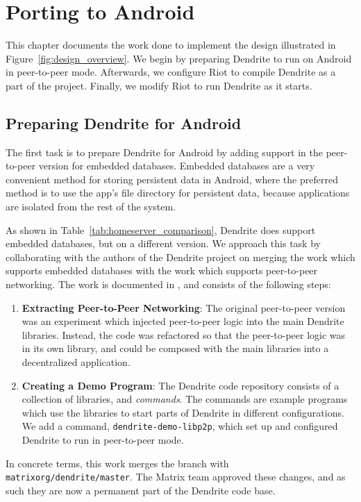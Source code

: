 \chapter{Porting to Android}\label{chp:implementation}
This chapter documents the work done to implement the design illustrated in Figure~\ref{fig:design_overview}.
We begin by preparing Dendrite to run on Android in peer-to-peer mode.
Afterwards, we configure Riot to compile Dendrite as a part of the project.
Finally, we modify Riot to run Dendrite as it starts.

\section{Preparing Dendrite for Android}\label{sec:preparing_dendrite}
The first task is to prepare Dendrite for Android by adding support in the peer-to-peer version for embedded databases.
Embedded databases are a very convenient method for storing persistent data in Android, where the preferred method is to use the app's file directory for persistent data\cite{android_devdocs_data_storage, android_devdocs_internal_storage}, because applications are isolated from the rest of the system.

As shown in Table~\ref{tab:homeserver_comparison}, Dendrite does support embedded databases, but on a different version.
We approach this task by collaborating with the authors of the Dendrite project on merging the work which supports embedded databases with the work which supports peer-to-peer networking.
The work is documented in , and consists of the following steps:
\begin{enumerate}
	\item{
	      \textbf{Extracting Peer-to-Peer Networking}:
	      The original peer-to-peer version was an experiment which injected peer-to-peer logic into the main Dendrite libraries.
	      Instead, the code was refactored so that the peer-to-peer logic was in its own library, and could be composed with the main libraries into a decentralized application.
	      }
	\item{
	      \textbf{Creating a Demo Program}:
	      The Dendrite code repository consists of a collection of libraries, and \textit{commands}.
	      The commands are example programs which use the libraries to start parts of Dendrite in different configurations.
	      We add a command, \texttt{dendrite-demo-libp2p}, which set up and configured Dendrite to run in peer-to-peer mode.
	      }
\end{enumerate}
In concrete terms, this work merges the  branch with \texttt{matrix\-org/dendrite/master}.
The Matrix team approved these changes, and as such they are now a permanent part of the Dendrite code base.

